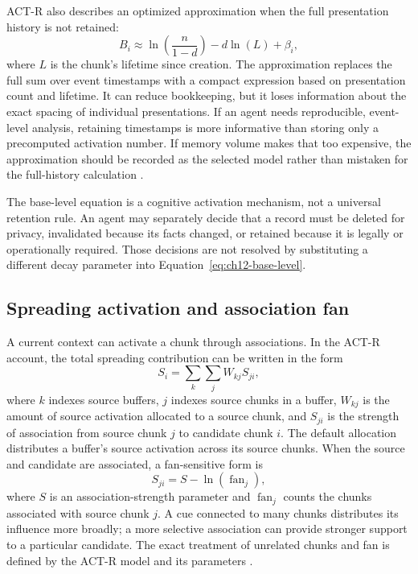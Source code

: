 ACT-R also describes an optimized approximation when the full presentation history is not retained:
\begin{equation}
  B_i \approx \ln\left(\frac{n}{1-d}\right)-d\ln(L)+\beta_i,
  \label{eq:ch12-base-level-approx}
\end{equation}
where \(L\) is the chunk's lifetime since creation. The approximation replaces the full sum over event timestamps with a compact expression based on presentation count and lifetime. It can reduce bookkeeping, but it loses information about the exact spacing of individual presentations. If an agent needs reproducible, event-level analysis, retaining timestamps is more informative than storing only a precomputed activation number. If memory volume makes that too expensive, the approximation should be recorded as the selected model rather than mistaken for the full-history calculation \autocite[pp. 263--264]{actr7manual}.

\begin{notebox}
The base-level equation is a cognitive activation mechanism, not a universal retention rule. An agent may separately decide that a record must be deleted for privacy, invalidated because its facts changed, or retained because it is legally or operationally required. Those decisions are not resolved by substituting a different decay parameter into Equation~\ref{eq:ch12-base-level}.
\end{notebox}

\subsection{Spreading activation and association fan}
\label{subsec:ch12-spreading}

A current context can activate a chunk through associations. In the ACT-R account, the total spreading contribution can be written in the form
\begin{equation}
  S_i = \sum_k \sum_j W_{kj}S_{ji},
  \label{eq:ch12-spreading-total}
\end{equation}
where \(k\) indexes source buffers, \(j\) indexes source chunks in a buffer, \(W_{kj}\) is the amount of source activation allocated to a source chunk, and \(S_{ji}\) is the strength of association from source chunk \(j\) to candidate chunk \(i\). The default allocation distributes a buffer's source activation across its source chunks. When the source and candidate are associated, a fan-sensitive form is
\begin{equation}
  S_{ji}=S-\ln(\operatorname{fan}_{j}),
  \label{eq:ch12-spreading-fan}
\end{equation}
where \(S\) is an association-strength parameter and \(\operatorname{fan}_{j}\) counts the chunks associated with source chunk \(j\). A cue connected to many chunks distributes its influence more broadly; a more selective association can provide stronger support to a particular candidate. The exact treatment of unrelated chunks and fan is defined by the ACT-R model and its parameters \autocite[p. 264]{actr7manual}.

